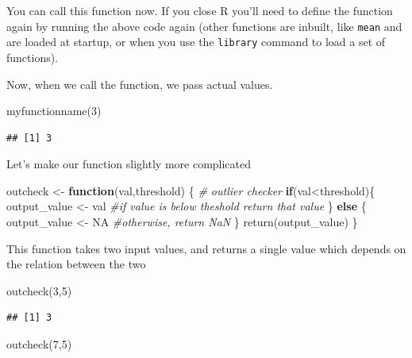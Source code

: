 \documentclass[
  12pt,
  a5paper,
]{book}
\newenvironment{Shaded}{\begin{snugshade}}{\end{snugshade}}
\newcommand{\CommentTok}[1]{\textcolor[rgb]{0.56,0.35,0.01}{\textit{#1}}}
\newcommand{\ConstantTok}[1]{\textcolor[rgb]{0.00,0.00,0.00}{#1}}
\newcommand{\ControlFlowTok}[1]{\textcolor[rgb]{0.13,0.29,0.53}{\textbf{#1}}}
\newcommand{\DecValTok}[1]{\textcolor[rgb]{0.00,0.00,0.81}{#1}}
\newcommand{\FunctionTok}[1]{\textcolor[rgb]{0.00,0.00,0.00}{#1}}
\newcommand{\NormalTok}[1]{#1}
\newcommand{\OtherTok}[1]{\textcolor[rgb]{0.56,0.35,0.01}{#1}}
\newcommand{\SpecialCharTok}[1]{\textcolor[rgb]{0.00,0.00,0.00}{#1}}
\begin{document}
You can call this function now. If you close R you'll need to define the function again by running the above code again (other functions are inbuilt, like \texttt{mean} and are loaded at startup, or when you use the \texttt{library} command to load a set of functions).

Now, when we call the function, we pass actual values.

\begin{Shaded}
\begin{Highlighting}[]
\FunctionTok{myfunctionname}\NormalTok{(}\DecValTok{3}\NormalTok{)}
\end{Highlighting}
\end{Shaded}

\begin{verbatim}
## [1] 3
\end{verbatim}

Let's make our function slightly more complicated

\begin{Shaded}
\begin{Highlighting}[]
\NormalTok{outcheck }\OtherTok{\textless{}{-}} \ControlFlowTok{function}\NormalTok{(val,threshold) \{}
\CommentTok{\# outlier checker}
\ControlFlowTok{if}\NormalTok{(val}\SpecialCharTok{\textless{}}\NormalTok{threshold)\{}
\NormalTok{  output\_value }\OtherTok{\textless{}{-}}\NormalTok{ val }\CommentTok{\#if value is below theshold return that value}
\NormalTok{\} }\ControlFlowTok{else}\NormalTok{ \{}
\NormalTok{  output\_value }\OtherTok{\textless{}{-}} \ConstantTok{NA} \CommentTok{\#otherwise, return NaN}
\NormalTok{\}}
\FunctionTok{return}\NormalTok{(output\_value)}
\NormalTok{\}}
\end{Highlighting}
\end{Shaded}

This function takes two input values, and returns a single value which depends on the relation between the two

\begin{Shaded}
\begin{Highlighting}[]
\FunctionTok{outcheck}\NormalTok{(}\DecValTok{3}\NormalTok{,}\DecValTok{5}\NormalTok{)}
\end{Highlighting}
\end{Shaded}

\begin{verbatim}
## [1] 3
\end{verbatim}

\begin{Shaded}
\begin{Highlighting}[]
\FunctionTok{outcheck}\NormalTok{(}\DecValTok{7}\NormalTok{,}\DecValTok{5}\NormalTok{)}
\end{Highlighting}
\end{Shaded}
\end{document}
